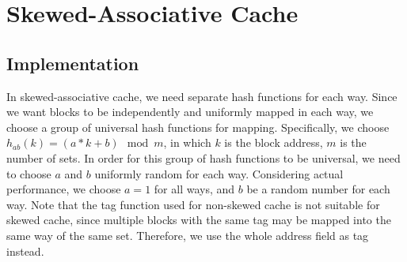 \documentclass[utf8]{article}
\begin{document}
\newpage

\section{Skewed-Associative Cache}

\subsection{Implementation}
In skewed-associative cache, we need separate hash functions for each way. Since we want blocks to be independently and uniformly mapped in each way, we choose a group of universal hash functions for mapping. Specifically, we choose $h_{ab}(k) = (a * k + b) \mod m$, in which $k$ is the block address, $m$ is the number of sets. In order for this group of hash functions to be universal, we need to choose $a$ and $b$ uniformly random for each way. Considering actual performance, we choose $a = 1$ for all ways, and $b$ be a random number for each way. Note that the tag function used for non-skewed cache is not suitable for skewed cache, since multiple blocks with the same tag may be mapped into the same way of the same set. Therefore, we use the whole address field as tag instead.
\end{document}
